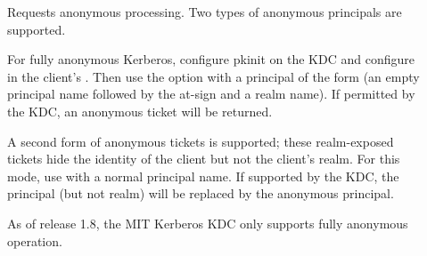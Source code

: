 \documentclass[letterpaper,10pt,english]{sphinxmanual}
\begin{document}
\begin{description}
\item[{}] \leavevmode
Requests anonymous processing.  Two types of anonymous principals
are supported.

For fully anonymous Kerberos, configure pkinit on the KDC and
configure  in the client’s .
Then use the  option with a principal of the form 
(an empty principal name followed by the at-sign and a realm
name).  If permitted by the KDC, an anonymous ticket will be
returned.

A second form of anonymous tickets is supported; these
realm-exposed tickets hide the identity of the client but not the
client’s realm.  For this mode, use  with a normal
principal name.  If supported by the KDC, the principal (but not
realm) will be replaced by the anonymous principal.

As of release 1.8, the MIT Kerberos KDC only supports fully
anonymous operation.

\end{description}
\end{document}
